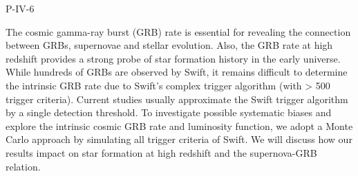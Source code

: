 P-IV-6


\bigskip



\bigskip

\noindent The cosmic gamma-ray burst (GRB) rate is essential for revealing the connection between GRBs, supernovae and stellar evolution. Also, the GRB rate at high redshift provides a strong probe of star formation history in the early universe. While hundreds of GRBs are observed by Swift, it remains difficult to determine the intrinsic GRB rate due to Swift’s complex trigger algorithm (with > 500 trigger criteria). Current studies usually approximate the Swift trigger algorithm by a single detection threshold. To investigate possible systematic biases and explore the intrinsic cosmic GRB rate and luminosity function, we adopt a Monte Carlo approach by simulating all trigger criteria of Swift. We will discuss how our results impact on star formation at high redshift and the supernova-GRB relation.
